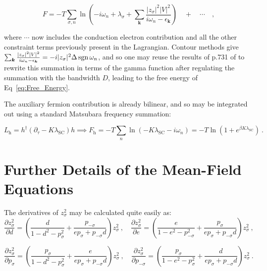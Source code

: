 \[
F = - T \sum_{\sigma, n} \ln{\left(- i \omega_{n} + \lambda_{\sigma} + \sum_{\boldsymbol{k}} \frac{|z_{\sigma}|^{2} |V|^{2}}{i \omega_{n} - \epsilon_{\boldsymbol{k}}}\right)} \quad + \quad \cdots \quad ,
\]

where $ \cdots $ now includes the conduction electron contribution and all the other constraint terms previously present in the Lagrangian. Contour methods give $ \sum_{\boldsymbol{k}} \frac{|z_{\sigma}|^{2} |V|^{2}}{i \omega_{n} - \epsilon_{\boldsymbol{k}}} = - i |z_{\sigma}|^2 \Delta \operatorname{sgn}{\omega_n} $, and so one may reuse the results of p.731 of \cite{ManyBodyPhysics} to rewrite this summation in terms of the gamma function after regulating the summation with the bandwidth $ D $, leading to the free energy of Eq~\eqref{eq:Free_Energy}.

The auxiliary fermion contribution is already bilinear, and so may be integrated out using a standard Matsubara frequency summation:

\[
L_{\text{h}} = h^{\dagger} \left( \partial_{\tau} - K \lambda_{\text{SC}} \right) h \implies F_{\text{h}} = - T \sum_{n} \ln{\left( - K \lambda_{\text{SC}}  - i \omega_n \right)} = - T \ln{\left( 1 + e^{\beta K \lambda_{\text{SC}}} \right)} ~.
\]



\section{Further Details of the Mean-Field Equations}
\label{sec:MF_eq_details}

The derivatives of $ z^2_{\sigma} $ may be calculated quite easily as:
\begin{equation}
\frac{\partial z^2_{\sigma}}{\partial d} = \left( \frac{d}{1 - d^2 - p^2_{\sigma}} + \frac{p_{-\sigma}}{e p_{\sigma} + p_{- \sigma} d} \right) z^2_{\sigma} ~, \quad \frac{\partial z^2_{\sigma}}{\partial e} = \left( \frac{e}{1 - e^2 - p^2_{-\sigma}} + \frac{p_{\sigma}}{e p_{\sigma} + p_{- \sigma} d} \right) z^2_{\sigma} ~,
\end{equation}

\begin{equation}
\frac{\partial z^2_{\sigma}}{\partial p_{\sigma}} = \left( \frac{p_{\sigma}}{1 - d^2 - p^2_{\sigma}} + \frac{e}{e p_{\sigma} + p_{- \sigma} d} \right) z^2_{\sigma} ~, \quad \frac{\partial z^2_{\sigma}}{\partial p_{-\sigma}} = \left( \frac{p_{\sigma}}{1 - e^2 - p^2_{\sigma}} + \frac{d}{e p_{\sigma} + p_{- \sigma} d} \right) z^2_{\sigma} ~.
\end{equation}

